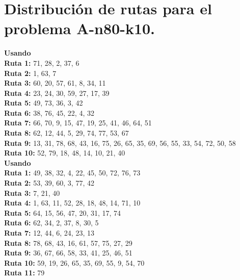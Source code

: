 \documentclass[a4paper,10pt,twocolumn]{article}
\begin{document}
	\section*{Distribución de rutas para el problema A-n80-k10.}
	\label{tab:result80_10}
	
	\hspace{9pt} \textbf{Usando }											\\
	\textbf{Ruta 1:} 71, 28, 2, 37, 6 	     		 										\\
	\textbf{Ruta 2:} 1, 63, 7   			 	     										\\
	\textbf{Ruta 3:} 60, 20, 57, 61, 8, 34, 11		 		  				 				\\
	\textbf{Ruta 4:} 23, 24, 30, 59, 27, 17, 39	     	 									\\
	\textbf{Ruta 5:} 49, 73, 36, 3, 42 				 										\\
	\textbf{Ruta 6:} 38, 76, 45, 22, 4, 32 													\\
	\textbf{Ruta 7:} 66, 70, 9, 15, 47, 19, 25, 41, 46, 64, 51 								\\
	\textbf{Ruta 8:} 62, 12, 44, 5, 29, 74, 77, 53, 67				 						\\
	\textbf{Ruta 9:} 13, 31, 78, 68, 43, 16, 75, 26, 65, 35, 69, 56, 55, 33, 54, 72, 50, 58 \\
	\textbf{Ruta 10:} 52, 79, 18, 48, 14, 10, 21, 40  										\\
	
	\textbf{Usando }								\\
	\textbf{Ruta 1:} 49, 38, 32, 4, 22, 45, 50, 72, 76, 73	\\
	\textbf{Ruta 2:} 53, 39, 60, 3, 77, 42		   			\\
	\textbf{Ruta 3:} 7, 21, 40		   						\\
	\textbf{Ruta 4:} 1, 63, 11, 52, 28, 18, 48, 14, 71, 10	\\
	\textbf{Ruta 5:} 64, 15, 56, 47, 20, 31, 17, 74		    \\
	\textbf{Ruta 6:} 62, 34, 2, 37, 8, 30, 5	   			\\
	\textbf{Ruta 7:} 12, 44, 6, 24, 23, 13 					\\
	\textbf{Ruta 8:} 78, 68, 43, 16, 61, 57, 75, 27, 29	    \\
	\textbf{Ruta 9:} 36, 67, 66, 58, 33, 41, 25, 46, 51		\\
	\textbf{Ruta 10:} 59, 19, 26, 65, 35, 69, 55, 9, 54, 70	\\
	\textbf{Ruta 11:} 79									\\
	
\end{document}
